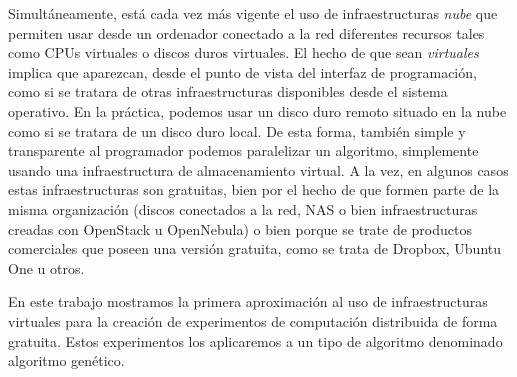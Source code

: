 \documentclass{article}
\begin{document}
Simultáneamente, está cada vez más vigente el uso de infraestructuras
{\em nube} que permiten usar desde un ordenador conectado a la red
diferentes recursos tales como CPUs virtuales o discos duros
virtuales. El hecho de que sean {\em virtuales} implica que aparezcan,
desde el punto de vista del interfaz de programación, como si se
tratara de otras infraestructuras disponibles desde el sistema
operativo. En la práctica, podemos usar un disco duro remoto situado
en la nube como si se tratara de un disco duro local. De esta forma,
también simple y transparente al programador podemos paralelizar un
algoritmo, simplemente usando una infraestructura de almacenamiento
virtual. A la vez, en algunos casos estas infraestructuras son
gratuitas, bien por el hecho de que formen parte de la misma
organización (discos conectados a la red, NAS o bien infraestructuras
creadas con OpenStack u OpenNebula) o bien porque se trate de
productos comerciales que poseen una versión gratuita, como se trata
de Dropbox, Ubuntu One u otros. 

En este trabajo mostramos la primera aproximación al uso de
infraestructuras virtuales para la creación de experimentos de
computación distribuida de forma gratuita. Estos experimentos los
aplicaremos a un tipo de algoritmo denominado algoritmo genético. 



\end{document}
